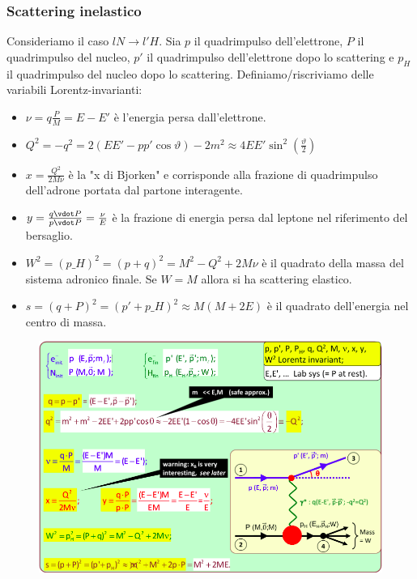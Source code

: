 \subsubsection{Scattering inelastico}
Consideriamo il caso $lN\to l'H$. Sia $p$ il quadrimpulso dell'elettrone, $P$ il quadrimpulso del nucleo, $p'$ il quadrimpulso dell'elettrone dopo lo scattering e $p_H$ il quadrimpulso del nucleo dopo lo scattering. Definiamo/riscriviamo delle variabili Lorentz-invarianti:
\begin{itemize}
    \item $\nu=q\frac PM=E-E'$ è l'energia persa dall'elettrone.
    \item $Q^2=-q^2=2(EE'-pp'\cos\vartheta)-2m^2\approx4EE'\sin^2(\frac\vartheta2)$ 
    \item $x=\frac{Q^2}{2M\nu}$ è la "x di Bjorken" e corrisponde alla frazione di quadrimpulso dell'adrone portata dal partone interagente.
    \item $y=\frac{q\vdot P}{p\vdot P}=\frac\nu E$ è la frazione di energia persa dal leptone nel riferimento del bersaglio.
    \item $W^2=(p\_H)^2=(p+q)^2=M^2-Q^2+2M\nu$ è il quadrato della massa del sistema adronico finale. Se $W=M$ allora si ha scattering elastico.
    \item $s=(q+P)^2=(p'+p\_H)^2\approx M(M+2E)$ è il quadrato dell'energia nel centro di massa.
\end{itemize}
\begin{figure}[H]
    \centering
    \includegraphics[width=\textwidth]{immagini/fig_conti_kinem.png}
\end{figure}
